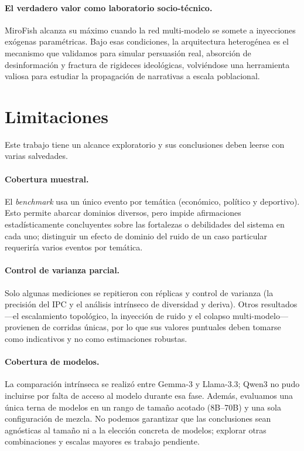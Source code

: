 \documentclass[11pt]{article}
\begin{document}
\paragraph{El verdadero valor como laboratorio socio-técnico.} MiroFish alcanza su máximo cuando la red multi-modelo se somete a inyecciones exógenas paramétricas. Bajo esas condiciones, la arquitectura heterogénea es el mecanismo que validamos para simular persuasión real, absorción de desinformación y fractura de rigideces ideológicas, volviéndose una herramienta valiosa para estudiar la propagación de narrativas a escala poblacional.

\section*{Limitaciones}

Este trabajo tiene un alcance exploratorio y sus conclusiones deben leerse con varias salvedades.

\paragraph{Cobertura muestral.} El \textit{benchmark} usa un único evento por temática (económico, político y deportivo). Esto permite abarcar dominios diversos, pero impide afirmaciones estadísticamente concluyentes sobre las fortalezas o debilidades del sistema en cada uno; distinguir un efecto de dominio del ruido de un caso particular requeriría varios eventos por temática.

\paragraph{Control de varianza parcial.} Solo algunas mediciones se repitieron con réplicas y control de varianza (la precisión del IPC y el análisis intrínseco de diversidad y deriva). Otros resultados —el escalamiento topológico, la inyección de ruido y el colapso multi-modelo— provienen de corridas únicas, por lo que sus valores puntuales deben tomarse como indicativos y no como estimaciones robustas.

\paragraph{Cobertura de modelos.} La comparación intrínseca se realizó entre Gemma-3 y Llama-3.3; Qwen3 no pudo incluirse por falta de acceso al modelo durante esa fase. Además, evaluamos una única terna de modelos en un rango de tamaño acotado (8B--70B) y una sola configuración de mezcla. No podemos garantizar que las conclusiones sean agnósticas al tamaño ni a la elección concreta de modelos; explorar otras combinaciones y escalas mayores es trabajo pendiente.
\end{document}

